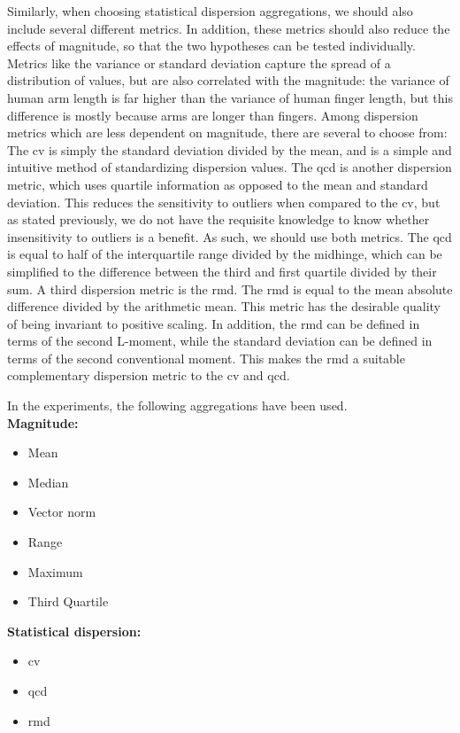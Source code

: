 \documentclass[UKenglish]{uiomasterthesis} %
\theoremstyle{definition}
\begin{document}
Similarly, when choosing statistical dispersion aggregations, we should also include several different metrics. In addition, these metrics should also reduce the effects of magnitude, so that the two hypotheses can be tested individually. Metrics like the variance or standard deviation capture the spread of a distribution of values, but are also correlated with the magnitude: the variance of human arm length is far higher than the variance of human finger length, but this difference is mostly because arms are longer than fingers. Among dispersion metrics which are less dependent on magnitude, there are several to choose from: The \ac{cv} is simply the standard deviation divided by the mean, and is a simple and intuitive method of standardizing dispersion values. The \ac{qcd} is another dispersion metric, which uses quartile information as opposed to the mean and standard deviation. This reduces the sensitivity to outliers when compared to the \ac{cv}, but as stated previously, we do not have the requisite knowledge to know whether insensitivity to outliers is a benefit. As such, we should use both metrics. The \ac{qcd} is equal to half of the interquartile range divided by the midhinge, which can be simplified to the difference between the third and first quartile divided by their sum. A third dispersion metric is the \ac{rmd}. The \ac{rmd} is equal to the mean absolute difference divided by the arithmetic mean. This metric has the desirable quality of being invariant to positive scaling. In addition, the \ac{rmd} can be defined in terms of the second L-moment, while the standard deviation can be defined in terms of the second conventional moment. This makes the \ac{rmd} a suitable complementary dispersion metric to the \ac{cv} and \ac{qcd}.

In the experiments, the following aggregations have been used. \\

\textbf{Magnitude:}
\begin{itemize}
    \itemsep0em
    \item Mean
    \item Median
    \item Vector norm
    \item Range
    \item Maximum
    \item Third Quartile
\end{itemize}

\textbf{Statistical dispersion:}
\begin{itemize}
    \itemsep0em
    \item \acf{cv}
    \item \acf{qcd}
    \item \acf{rmd}
\end{itemize}
\end{document}
